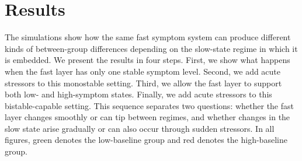 \documentclass[man,12pt,floatsintext]{apa7}
\begin{document}
\section{Results}\label{sec:results}
The simulations show how the same fast symptom system can produce different kinds of between-group differences depending on the slow-state regime in which it is embedded. We present the results in four steps. First, we show what happens when the fast layer has only one stable symptom level. Second, we add acute stressors to this monostable setting. Third, we allow the fast layer to support both low- and high-symptom states. Finally, we add acute stressors to this bistable-capable setting. This sequence separates two questions: whether the fast layer changes smoothly or can tip between regimes, and whether changes in the slow state arise gradually or can also occur through sudden stressors. In all figures, green denotes the low-baseline group and red denotes the high-baseline group.
\end{document}
